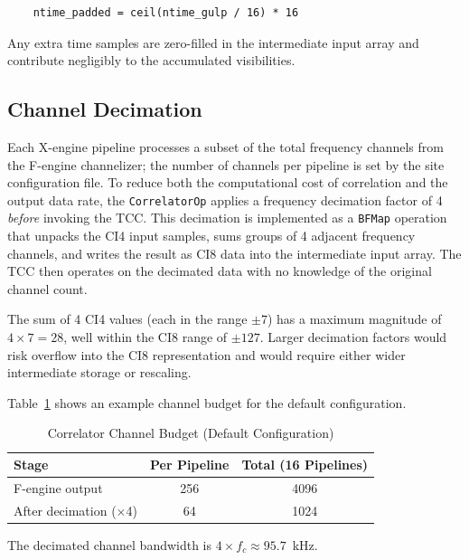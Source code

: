 \begin{verbatim}
    ntime_padded = ceil(ntime_gulp / 16) * 16
\end{verbatim}

\noindent Any extra time samples are zero-filled in the intermediate input array and contribute negligibly to the accumulated visibilities.

\subsection{Channel Decimation}
\label{sec:cor-decimation}

Each X-engine pipeline processes a subset of the total frequency channels from the F-engine channelizer; the number of channels per pipeline is set by the site configuration file.  To reduce both the computational cost of correlation and the output data rate, the \texttt{CorrelatorOp} applies a frequency decimation factor of 4 \emph{before} invoking the TCC.  This decimation is implemented as a \texttt{BFMap} operation that unpacks the CI4 input samples, sums groups of 4 adjacent frequency channels, and writes the result as CI8 data into the intermediate input array.  The TCC then operates on the decimated data with no knowledge of the original channel count.

The sum of 4 CI4 values (each in the range $\pm 7$) has a maximum magnitude of $4 \times 7 = 28$, well within the CI8 range of $\pm 127$.  Larger decimation factors would risk overflow into the CI8 representation and would require either wider intermediate storage or rescaling.

Table~\ref{tab:cor-channel-budget} shows an example channel budget for the default configuration.

\begin{table}[htbp]
    \centering
    \caption{Correlator Channel Budget (Default Configuration)}
    \label{tab:cor-channel-budget}
    \begin{tabular}{lcc}
        \toprule
        \textbf{Stage} & \textbf{Per Pipeline} & \textbf{Total (16 Pipelines)} \\
        \midrule
        F-engine output     & 256 & 4096 \\
        After decimation ($\times$4) & 64  & 1024 \\
        \bottomrule
    \end{tabular}
\end{table}

The decimated channel bandwidth is $4 \times f_c \approx 95.7$~kHz.

